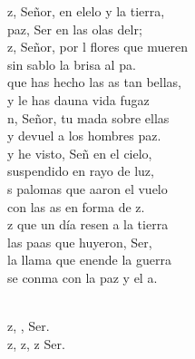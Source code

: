 \documentclass[12pt]{article}
\begin{document}
\begin{multicols*}{2}
\begin{cancion}%
	z, Señor, en elelo y la tierra,\\
	paz, Ser en las olas delr;\\
	z, Señor, por l flores que mueren\\
	sin sablo la brisa al pa.\\
\jump
	 que has hecho las as tan bellas, \\
	y le has dauna vida fugaz\\
	n, Señor, tu mada sobre ellas\\
	y devuel a los hombres paz.\\
\jump
	y he visto, Señ en el cielo, \\
	suspendido en rayo de luz,\\
	s palomas que aaron el vuelo\\
	con las as en forma de z.\\
\jump
	z que un día resen a la tierra\\
	las paas que huyeron, Ser,\\
	la llama que enende la guerra\\
	se conma con la paz y el a.\\\jump\\
	\begin{chorus}%
	z, ,  Ser.\\
	z, z, z Ser.\\
	\end{chorus}%
	\jump\\
\end{cancion}%


\end{multicols*}
\end{document}
